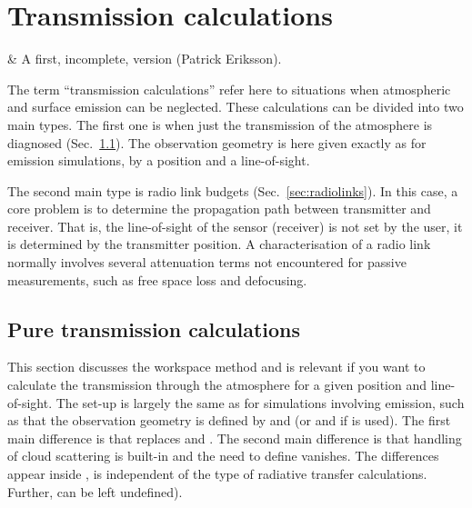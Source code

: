 \chapter{Transmission calculations}
 \label{sec:trans}


 & A first, incomplete, version (Patrick Eriksson).\\
\stophistory

The term ``transmission calculations'' refer here to situations when
atmospheric and surface emission can be neglected. These calculations can be
divided into two main types. The first one is when just the transmission of the
atmosphere is diagnosed (Sec.~\ref{sec:transmission}). The observation geometry
is here given exactly as for emission simulations, by a position and a
line-of-sight.

The second main type is radio link budgets (Sec.~\ref{sec:radiolinks}). In this
case, a core problem is to determine the propagation path between transmitter
and receiver. That is, the line-of-sight of the sensor (receiver) is not set by
the user, it is determined by the transmitter position. A characterisation of a
radio link normally involves several attenuation terms not encountered for
passive measurements, such as free space loss and defocusing.




\section{Pure transmission calculations}
\label{sec:transmission}

This section discusses the  workspace method
and is relevant if you want to calculate the transmission through the
atmosphere for a given position and line-of-sight. The set-up is largely the
same as for simulations involving emission, such as that the observation
geometry is defined by  and  (or
 and  if  is used).
The first main difference is that  replaces
 and . The second
main difference is that handling of cloud scattering is built-in and the need
to define  vanishes. The differences appear
inside ,  is independent of the type
of radiative transfer calculations. Further,
 can be left undefined).

